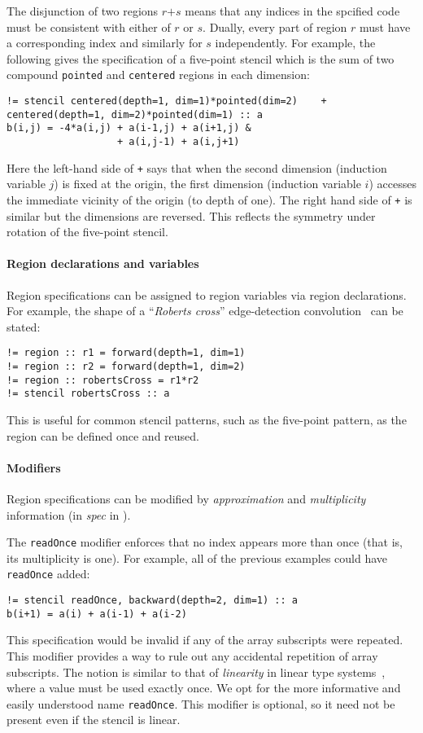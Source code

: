 \documentclass[10pt,preprint]{sigplanconf}
\theoremstyle{definition}
\newcommand{\term}[1]{\texttt{#1}}
\begin{document}
The disjunction of two regions $r \term{+} s$ means that any indices
in the spcified code must be consistent with either of $r$ or $s$.
Dually, every part of region $r$ must have a
corresponding index and similarly for $s$ independently. For
example, the following gives the specification of a five-point
stencil which is the sum of two compound \texttt{pointed} and
\texttt{centered} regions in each dimension:
%
\begin{verbatim}
!= stencil centered(depth=1, dim=1)*pointed(dim=2)    + centered(depth=1, dim=2)*pointed(dim=1) :: a
b(i,j) = -4*a(i,j) + a(i-1,j) + a(i+1,j) &
                   + a(i,j-1) + a(i,j+1)
\end{verbatim}
Here the left-hand side of \texttt{+} says that when the second dimension
(induction variable $j$) is fixed at the origin, the first dimension
(induction variable $i$) accesses the immediate vicinity of the origin
(to depth of one). The right hand side of \texttt{+} is similar but the dimensions are reversed.
This reflects the symmetry under rotation of the five-point stencil.

\paragraph{Region declarations and variables}

Region specifications can be assigned to region variables via
region declarations. For example, the shape of a
``\emph{Roberts cross}'' edge-detection convolution~\cite{davis1975survey}
can be stated:
\begin{verbatim}
!= region :: r1 = forward(depth=1, dim=1)
!= region :: r2 = forward(depth=1, dim=2)
!= region :: robertsCross = r1*r2
!= stencil robertsCross :: a
\end{verbatim}
This is useful for common stencil patterns, such as the five-point
pattern, as the region can be defined once and reused.
\paragraph{Modifiers}
Region specifications can be modified
by \emph{approximation} and \emph{multiplicity} information
(in \textit{spec} in ).

The \texttt{readOnce} modifier enforces that no index appears more
than once (that is, its multiplicity is one). For example, all of
the previous examples could have \texttt{readOnce} added:
%
\begin{verbatim}
!= stencil readOnce, backward(depth=2, dim=1) :: a
b(i+1) = a(i) + a(i-1) + a(i-2)
\end{verbatim}
%
This specification would be invalid if any of the
array subscripts were repeated. This modifier provides a way to
rule out any accidental repetition of array subscripts.
The notion is similar to that of \emph{linearity} in linear type
systems~\cite{wadler1990linear}, where a value must be used
exactly once. We opt for the more informative and easily understood name
\texttt{readOnce}. This modifier is optional, so it need not
be present even if the stencil is linear.
\end{document}
